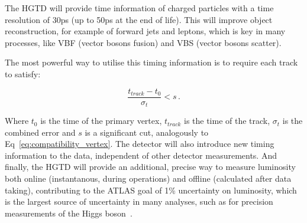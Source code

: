 
The HGTD will provide time information of charged particles with a time resolution of 30ps (up to 50ps at the end of life). %
This will improve object reconstruction, for example of forward jets and leptons, which is key in many processes, like VBF (vector bosons fusion) and VBS (vector bosons scatter). %

The most powerful way to utilise this timing information is to require each track to satisfy:

\begin{equation}
    \frac{t_{track}-t_0}{\sigma_t} < s \,.
\end{equation}

Where \(t_0\) is the time of the primary vertex, \(t_{track}\) is the time of the track, \(\sigma_t\) is the combined error and \(s\) is a significant cut, analogously to Eq~\ref{eq:compatibility_vertex}. %
The detector will also introduce new timing information to the data, independent of other detector measurements. And finally, the HGTD will provide an additional, precise way to measure luminosity both online (instantanous, during operations) and offline (calculated after data taking), contributing to the ATLAS goal of 1\% uncertainty on luminosity, which is the largest source of uncertainty in many analyses, such as for precision measurements of the Higgs boson~\cite{CERN-LHCC-2020-007}.


